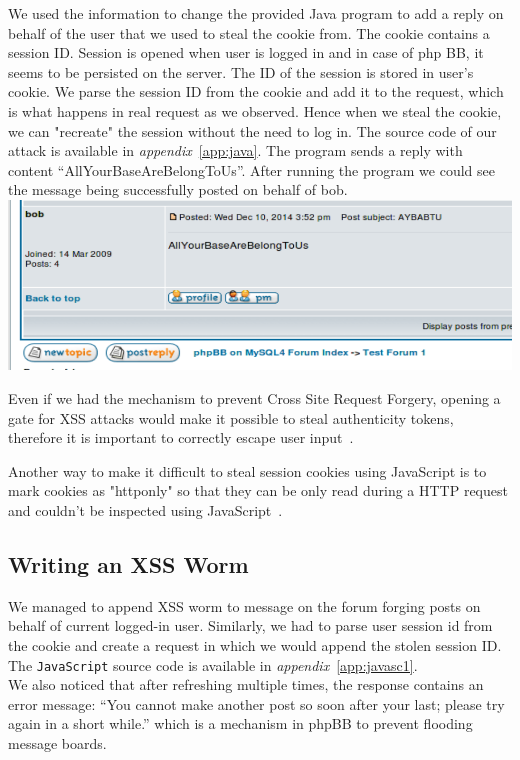\documentclass[12pt, a4paper]{article}
\begin{document}
We used the information to change the provided Java program to add a reply on behalf of the user that we used to steal the cookie from. The cookie contains a session ID. Session is opened when user is logged in and in case of php BB, it seems to be persisted on the server. The ID of the session is stored in user's cookie. We parse the session ID from the cookie and add it to the request, which is what happens in real request as we observed. Hence when we steal the cookie, we can "recreate" the session without the need to log in. The source code of our attack is available in \emph{appendix}~\ref{app:java}. The program sends a reply with content ``AllYourBaseAreBelongToUs''. After running the program we could see the message being successfully posted on behalf of bob.\\

\includegraphics[width=.95\textwidth]{gfx/xss/task4-attack-done.png}

Even if we had the mechanism to prevent Cross Site Request Forgery, opening a gate for XSS attacks would make it possible to steal authenticity tokens, therefore it is important to correctly escape user input~\cite{csrf}.

Another way to make it difficult to steal session cookies using JavaScript is to mark cookies as "httponly" so that they can be only read during a HTTP request and couldn't be inspected using JavaScript~\cite{httponly}.

\subsection{Writing an XSS Worm}
We managed to append XSS worm to message on the forum forging posts on behalf of current logged-in user. Similarly, we had to parse user session id from the cookie and create a request in which we would append the stolen session ID. The \texttt{JavaScript} source code is available in \emph{appendix}~\ref{app:javasc1}.\\

We also noticed that after refreshing multiple times, the response contains an error message: ``You cannot make another post so soon after your last; please try again in a short while.'' which is a mechanism in phpBB to prevent flooding message boards.
\end{document}
